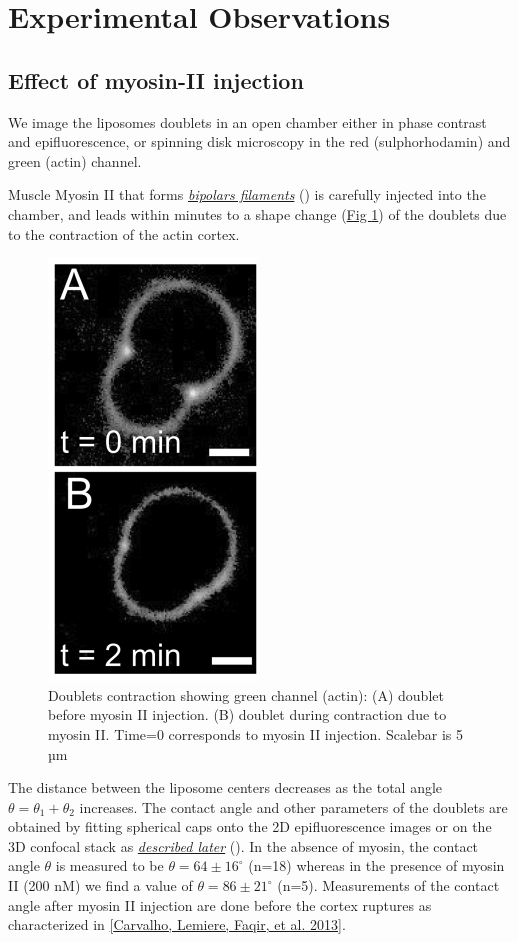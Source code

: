 \documentclass[A4paperpaper,11pt,english]{sphinxmanual}
\begin{document}
\section{Experimental Observations}
\label{index-latex:experimental-observations}

\subsection{Effect of myosin-II injection}
\label{index-latex:effect-of-myosin-ii-injection}
We image the liposomes doublets in an open chamber either in phase contrast
and epifluorescence, or spinning disk microscopy in the red (sulphorhodamin)
and green (actin) channel.

Muscle Myosin II that forms {\hyperref[index-latex:myoii]{\emph{bipolars filaments}}} () is carefully injected into
the chamber, and leads within minutes to a shape change (\hyperref[index-latex:doublets-contraction]{Fig  \ref*{index-latex:doublets-contraction}})
of the doublets due to the contraction of the actin cortex.
\begin{figure}[htbp]
\centering
\capstart

\includegraphics[width=0.300\linewidth]{doublet-contract.png}
\caption{Doublets contraction showing green channel (actin): (A) doublet before
myosin II injection. (B) doublet during contraction due to myosin II. Time=0 corresponds to myosin II injection.
Scalebar is 5 µm}\label{index-latex:doublets-contraction}\end{figure}

The distance between the liposome centers decreases as the total angle \(\theta
= \theta_1+\theta_2\) increases. The contact angle and other parameters of the
doublets are obtained by fitting spherical caps onto the 2D epifluorescence
images or on the 3D confocal stack as {\hyperref[index-latex:full3dfit]{\emph{described later}}} ().  In the absence of myosin, the
contact angle \(\theta\) is measured to be \(\theta = 64 \pm 16 ^{\circ}\) (n=18) whereas in
the presence of myosin II (200 nM) we find a value of \(\theta = 86 \pm 21
^{\circ}\) (n=5). Measurements of the contact angle after myosin II injection are done before the cortex
ruptures as characterized in {\hyperref[index-latex:carvalho2013a]{{[}Carvalho, Lemiere, Faqir,  et al.  2013{]}}}.
\end{document}
